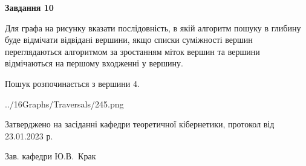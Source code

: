 \documentclass[12pt, ukrainian]{article}
\begin{document}
{\begin {large}
{\begin {center}\textbf{Завдання 10}\end {center}}\par
Для графа на рисунку вказати послідовність, в якій алгоритм пошуку в глибину буде відмічати відвідані вершини, якщо списки суміжності вершин переглядаються алгоритмом за зростанням міток вершин та вершини відмічаються на першому вход\-женні у вершину.\par
Пошук розпочинається з вершини 4.\par

\begin{center}
	{../16Graphs/Traversals/245.png}
\end{center}\par
\newpage


\end {large}
}
{\smallskip \begin {small} Затверджено на засіданні кафедри теоретичної кібернетики, протокол  від   23.01.2023 р.\par\smallskip\smallskip
{\parbox {6.5 cm}{Зав. кафедри \dotfill Ю.В.~Крак}} \end{small}}
\end{document}
